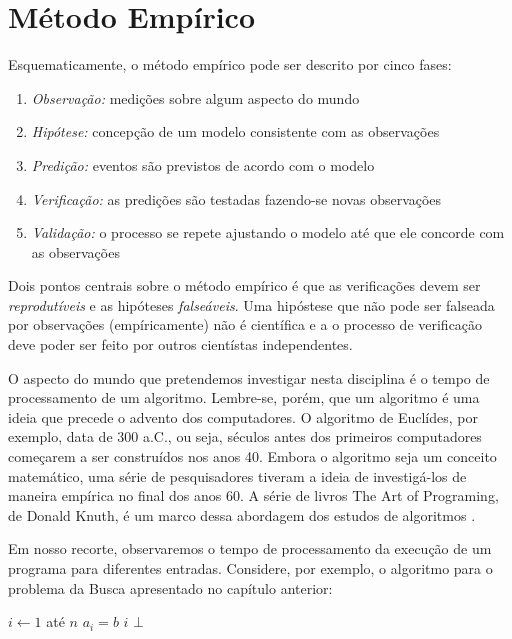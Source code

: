 \chapter{Método Empírico}

Esquematicamente, o método empírico pode ser descrito por cinco fases:
\begin{enumerate}
\item {\em Observação:} medições sobre algum aspecto do mundo
\item {\em Hipótese:} concepção de um modelo consistente com as observações
\item {\em Predição:} eventos são previstos de acordo com o modelo
\item {\em Verificação:} as predições são testadas fazendo-se novas observações
\item {\em Validação:} o processo se repete ajustando o modelo até que ele concorde com as observações
\end{enumerate}

Dois pontos centrais sobre o método empírico é que as verificações devem ser {\em reprodutíveis} e as hipóteses {\em falseáveis}.
Uma hipóstese que não pode ser falseada por observações (empíricamente) não é científica e a o processo de verificação deve poder ser feito por outros cientístas independentes.

O aspecto do mundo que pretendemos investigar nesta disciplina é o tempo de processamento de um algoritmo.
Lembre-se, porém, que um algoritmo é uma ideia que precede o advento dos computadores.
O algoritmo de Euclídes, por exemplo, data de 300 a.C., ou seja, séculos antes dos primeiros computadores começarem a ser construídos nos anos 40.
Embora o algoritmo seja um conceito matemático, uma série de pesquisadores tiveram a ideia de investigá-los de maneira empírica no final dos anos 60.
A série de livros The Art of Programing, de Donald Knuth, é um marco dessa abordagem dos estudos de algoritmos \cite{knuth97}.

Em nosso recorte, observaremos o tempo de processamento da execução de um programa para diferentes entradas.
Considere, por exemplo, o algoritmo para o problema da Busca apresentado no capítulo anterior:

\begin{codebox}
\li \For $i \gets 1$ até $n$
\li \Do \If $a_i = b$
\li     \Then \Return $i$
        \End
    \End
\li \Return $\bot$
\End
\end{codebox}

